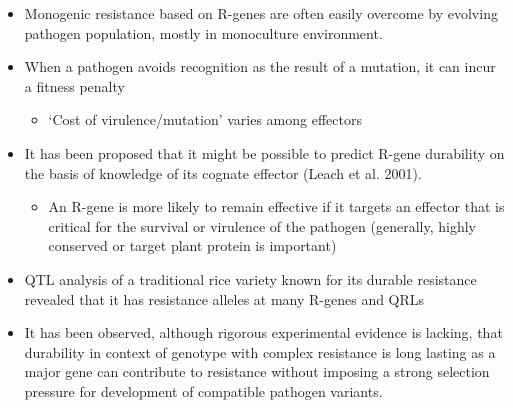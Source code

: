 \documentclass[11pt,dvipsnames,ignorenonframetext,aspectratio=169]{beamer}
\providecommand{\tightlist}{%
  \setlength{\itemsep}{0pt}\setlength{\parskip}{0pt}}
\begin{document}
\begin{frame}{}
\protect\hypertarget{section-1}{}
\small

\begin{itemize}
\tightlist
\item
  \alert{Monogenic resistance} based on R-genes are often easily
  overcome by evolving pathogen population, mostly in monoculture
  environment.
\item
  When a pathogen avoids recognition as the result of a mutation, it can
  incur a fitness penalty

  \begin{itemize}
  \tightlist
  \item
    `Cost of virulence/mutation' varies among effectors
  \end{itemize}
\item
  It has been proposed that it might be possible to predict R-gene
  durability on the basis of knowledge of its cognate effector (Leach et
  al. 2001).

  \begin{itemize}
  \tightlist
  \item
    An R-gene is more likely to remain effective if it targets an
    effector that is critical for the survival or virulence of the
    pathogen (generally, highly conserved or target plant protein is
    important)
  \end{itemize}
\item
  QTL analysis of a traditional rice variety known for its durable
  resistance revealed that it has resistance alleles at many R-genes and
  QRLs
\item
  It has been observed, although rigorous experimental evidence is
  lacking, that durability in context of genotype with
  \alert{complex resistance} is long lasting as a major gene can
  contribute to resistance without imposing a strong selection pressure
  for development of compatible pathogen variants.
\end{itemize}
\end{frame}
\end{document}
